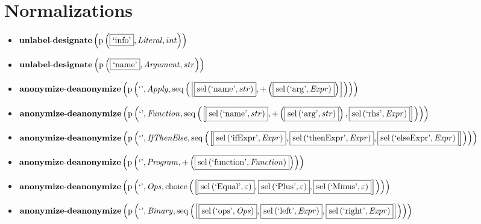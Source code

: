 \section{Normalizations}
{\footnotesize\begin{itemize}
\item $\mathbf{unlabel\text{-}designate}\\\left(\mathrm{p}\left(\fbox{\text{`info'}},\mathit{Literal},int\right)\right)$
\item $\mathbf{unlabel\text{-}designate}\\\left(\mathrm{p}\left(\fbox{\text{`name'}},\mathit{Argument},str\right)\right)$
\item $\mathbf{anonymize\text{-}deanonymize}\\\left(\mathrm{p}\left(\text{`'},\mathit{Apply},\mathrm{seq}\left(\left[\fbox{$\mathrm{sel}\left(\text{`name'},str\right)$}, {+}\left(\fbox{$\mathrm{sel}\left(\text{`arg'},\mathit{Expr}\right)$}\right)\right]\right)\right)\right)$
\item $\mathbf{anonymize\text{-}deanonymize}\\\left(\mathrm{p}\left(\text{`'},\mathit{Function},\mathrm{seq}\left(\left[\fbox{$\mathrm{sel}\left(\text{`name'},str\right)$}, {+}\left(\fbox{$\mathrm{sel}\left(\text{`arg'},str\right)$}\right), \fbox{$\mathrm{sel}\left(\text{`rhs'},\mathit{Expr}\right)$}\right]\right)\right)\right)$
\item $\mathbf{anonymize\text{-}deanonymize}\\\left(\mathrm{p}\left(\text{`'},\mathit{IfThenElse},\mathrm{seq}\left(\left[\fbox{$\mathrm{sel}\left(\text{`ifExpr'},\mathit{Expr}\right)$}, \fbox{$\mathrm{sel}\left(\text{`thenExpr'},\mathit{Expr}\right)$}, \fbox{$\mathrm{sel}\left(\text{`elseExpr'},\mathit{Expr}\right)$}\right]\right)\right)\right)$
\item $\mathbf{anonymize\text{-}deanonymize}\\\left(\mathrm{p}\left(\text{`'},\mathit{Program},{+}\left(\fbox{$\mathrm{sel}\left(\text{`function'},\mathit{Function}\right)$}\right)\right)\right)$
\item $\mathbf{anonymize\text{-}deanonymize}\\\left(\mathrm{p}\left(\text{`'},\mathit{Ops},\mathrm{choice}\left(\left[\fbox{$\mathrm{sel}\left(\text{`Equal'},\varepsilon\right)$}, \fbox{$\mathrm{sel}\left(\text{`Plus'},\varepsilon\right)$}, \fbox{$\mathrm{sel}\left(\text{`Minus'},\varepsilon\right)$}\right]\right)\right)\right)$
\item $\mathbf{anonymize\text{-}deanonymize}\\\left(\mathrm{p}\left(\text{`'},\mathit{Binary},\mathrm{seq}\left(\left[\fbox{$\mathrm{sel}\left(\text{`ops'},\mathit{Ops}\right)$}, \fbox{$\mathrm{sel}\left(\text{`left'},\mathit{Expr}\right)$}, \fbox{$\mathrm{sel}\left(\text{`right'},\mathit{Expr}\right)$}\right]\right)\right)\right)$

\end{itemize}}
